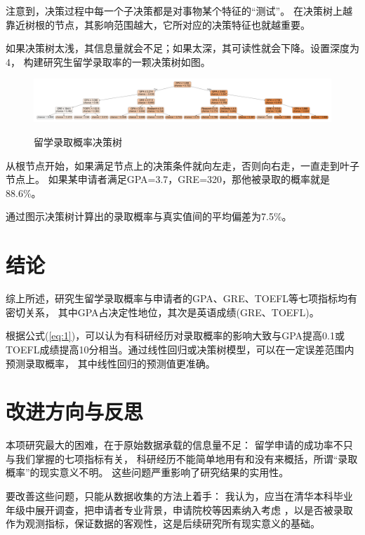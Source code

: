 \documentclass[12pt, UTF8, a4paper]{ctexart}
\begin{document}
注意到，决策过程中每一个子决策都是对事物某个特征的“测试”。
在决策树上越靠近树根的节点，其影响范围越大，它所对应的决策特征也就越重要。

如果决策树太浅，其信息量就会不足；如果太深，其可读性就会下降。设置深度为4，
构建研究生留学录取率的一颗决策树如图。

\begin{figure}[htb]\label{tree}
    \centering
    \includegraphics[width=6in, keepaspectratio]{./pic/tree.pdf}\\
    \caption{留学录取概率决策树}
\end{figure}

从根节点开始，如果满足节点上的决策条件就向左走，否则向右走，一直走到叶子节点上。
如果某申请者满足GPA=3.7，GRE=320，那他被录取的概率就是88.6\%。

通过图示决策树计算出的录取概率与真实值间的平均偏差为7.5\%。

\section{结论}

综上所述，研究生留学录取概率与申请者的GPA、GRE、TOEFL等七项指标均有密切关系，
其中GPA占决定性地位，其次是英语成绩(GRE、TOEFL)。

根据公式(\ref{eq:1})，可以认为有科研经历对录取概率的影响大致与GPA提高0.1或
TOEFL成绩提高10分相当。通过线性回归或决策树模型，可以在一定误差范围内预测录取概率，
其中线性回归的预测值更准确。

\section{改进方向与反思}

本项研究最大的困难，在于原始数据承载的信息量不足：
留学申请的成功率不只与我们掌握的七项指标有关，
科研经历不能简单地用有和没有来概括，所谓“录取概率”的现实意义不明。
这些问题严重影响了研究结果的实用性。

要改善这些问题，只能从数据收集的方法上着手：
我认为，应当在清华本科毕业年级中展开调查，把申请者专业背景，申请院校等因素纳入考虑
，以是否被录取作为观测指标，保证数据的客观性，这是后续研究所有现实意义的基础。
\end{document}
